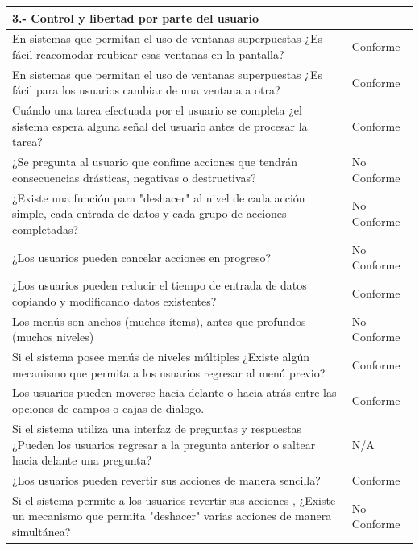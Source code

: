 \documentclass[stu, 12pt, letterpaper, donotrepeattitle, floatsintext, natbib]{apa7}
\begin{document}
\begin{longtable}{|>{\raggedright\arraybackslash}p{10cm}|>{\centering\arraybackslash}p{3cm}|}
    \textbf{3.- Control y libertad  por parte del usuario} & \\ \hline
    En sistemas que permitan el uso de ventanas superpuestas ¿Es fácil reacomodar reubicar esas ventanas en la pantalla? & Conforme \\ \hline
    En sistemas que permitan el uso de ventanas superpuestas ¿Es fácil para los usuarios cambiar de una ventana a otra? & Conforme \\ \hline
    Cuándo una tarea efectuada por el usuario se completa ¿el sistema espera alguna señal del usuario antes de procesar la tarea? & Conforme \\ \hline
    ¿Se pregunta al usuario que confime acciones que tendrán consecuencias drásticas, negativas o destructivas? & No Conforme \\ \hline
    ¿Existe una función para "deshacer" al nivel de cada acción simple, cada entrada de datos y cada grupo de acciones completadas? & No Conforme \\ \hline
    ¿Los usuarios pueden cancelar acciones en progreso? & No Conforme \\ \hline
    ¿Los usuarios pueden reducir el tiempo de entrada de datos copiando y modificando datos existentes? & Conforme \\ \hline
    Los menús son anchos (muchos ítems), antes que profundos (muchos niveles) & No Conforme \\ \hline
    Si el sistema posee menús de niveles múltiples ¿Existe algún mecanismo que permita a los usuarios regresar al menú previo? & Conforme \\ \hline
    Los usuarios pueden moverse hacia delante o hacia atrás entre las opciones de campos o cajas de dialogo. & Conforme \\ \hline
    Si el sistema utiliza una interfaz de preguntas y respuestas ¿Pueden los usuarios regresar a la pregunta anterior o saltear hacia delante una pregunta? & N/A \\ \hline
    ¿Los usuarios pueden revertir sus acciones de manera sencilla? & Conforme \\ \hline
    Si el sistema permite a los usuarios revertir sus acciones , ¿Existe un mecanismo que permita "deshacer" varias acciones de manera simultánea?  & No Conforme \\ \hline


\end{longtable}
\end{document}
